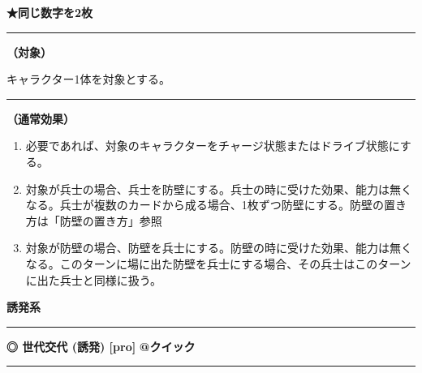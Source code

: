 \documentclass[twocolumn,a5paper,papersize,10pt]{jarticle}
\begin{document}
{\footnotesize\bf ★同じ数字を2枚}

\vspace{1mm}%
\hrule height 0.1mm depth 0mm width 66.5mm %
\vspace{1mm}%
{\bf（対象）}

キャラクター1体を対象とする。
\vspace{1mm}%
\hrule height 0.1mm depth 0mm width 66.5mm %
\vspace{1mm}%

{\bf（通常効果）}


\vspace{-1zh}%
\begin{enumerate}
\setlength{\leftskip}{-0.3cm}
\setlength{\parskip}{0pt} %

\item 必要であれば、対象のキャラクターをチャージ状態またはドライブ状態にする。

\item 対象が兵士の場合、兵士を防壁にする。兵士の時に受けた効果、能力は無くなる。兵士が複数のカードから成る場合、1枚ずつ防壁にする。防壁の置き方は「防壁の置き方」参照

\item 対象が防壁の場合、防壁を兵士にする。防壁の時に受けた効果、能力は無くなる。このターンに場に出た防壁を兵士にする場合、その兵士はこのターンに出た兵士と同様に扱う。
\vspace{-1zh}%
\end{enumerate}


\begin{tcolorbox}
{\scriptsize\bf 誘発系}
\end{tcolorbox}
\vspace{-1zh}%
\vspace{2mm} %
\hrule height 0.5mm depth 0mm width 66.5mm %
\vspace{1mm} %
{\small\bf ◎ 世代交代 {\scriptsize (誘発) [pro]}} %
\hfill 
{\footnotesize\bf @クイック }


\vspace{1mm}%
\hrule height 0.1mm depth 0mm width 66.5mm %
\vspace{1mm}%
\end{document}
